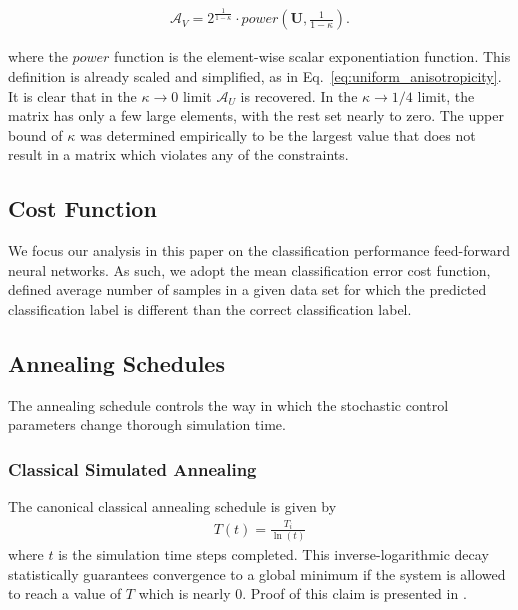 \documentclass[10pt,journal,cspaper,compsoc]{IEEEtran}
\begin{document}
\begin{align}
\boldsymbol{\mathcal{A}}_V =  2^{\frac{1}{1-\kappa}} \cdot power\left(\boldsymbol{U}, {\frac{1}{1-\kappa}}\right).
\end{align}

\noindent where the $power$ function is the element-wise scalar exponentiation function. This definition is already scaled and simplified, as in Eq.~\ref{eq:uniform_anisotropicity}. It is clear that in the $\kappa \rightarrow 0$ limit $\boldsymbol{\mathcal{A}}_U$ is recovered. In the $\kappa \rightarrow 1/4$ limit, the matrix has only a few large elements, with the rest set nearly to zero. The upper bound of $\kappa$ was determined empirically to be the largest value that does not result in a matrix which violates any of the constraints.

\subsection{Cost Function}
\label{scn:cost_functions}

We focus our analysis in this paper on the classification performance feed-forward neural networks. As such, we adopt the mean classification error cost function, defined average number of samples in a given data set for which the predicted classification label is different than the correct classification label.


\subsection{Annealing Schedules}
\label{scn:annealing_schedules}

The annealing schedule controls the way in which the stochastic control parameters change thorough simulation time. 

\subsubsection{Classical Simulated Annealing}
The canonical classical annealing schedule is given by  
\begin{align}
	T(t) = \frac{T_i}{\ln(t)}
\end{align}
\noindent where $t$ is the simulation time steps completed. This inverse-logarithmic decay statistically guarantees convergence to a global minimum if the system is allowed to reach a value of $T$ which is nearly $0$. Proof of this claim is presented in \cite{geman1984stochasticrelaxation}.
\end{document}
